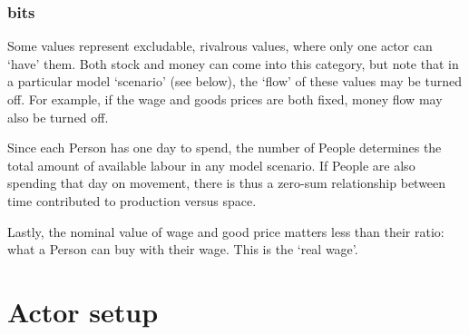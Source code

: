 %


\subsubsection{bits}

Some values represent excludable, rivalrous values, where only one actor can `have' them. Both stock and money can come into this category, but note that in a particular model `scenario' (see below), the `flow' of these values may be turned off. For example, if the wage and goods prices are both fixed, money flow may also be turned off.


Since each Person has one day to spend, the number of People determines the total amount of available labour in any model scenario. If People are also spending that day on movement, there is thus a zero-sum relationship between time contributed to production versus space.

Lastly, the nominal value of wage and good price matters less than their ratio: what a Person can buy with their wage. This is the `real wage'. 

\section{Actor setup \label{sec:actorSetup}}

